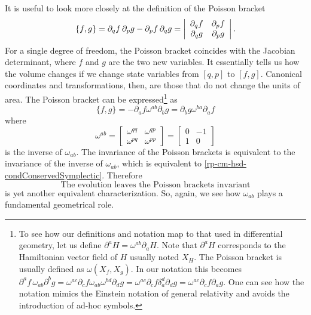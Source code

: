 It is useful to look more closely at the definition of the Poisson bracket
\begin{equation}
	\{f, g\} = \partial_q f \, \partial_p g - \partial_p f \, \partial_q g = \left|\begin{array}{ c c }
		\partial_q f & \partial_p f \\
		\partial_q g & \partial_p g \\
	\end{array} \right|.
\end{equation}
For a single degree of freedom, the Poisson bracket coincides with the Jacobian determinant, where $f$ and $g$ are the two new variables. It essentially tells us how the volume changes if we change state variables from $[q, p]$ to $[f, g]$. Canonical coordinates and transformations, then, are those that do not change the units of area. The Poisson bracket can be expressed\footnote{To see how our definitions and notation map to that used in differential geometry, let us define $\partial^a H = \omega^{ab} \partial_a H$. Note that $\partial^a H$ corresponds to the Hamiltonian vector field of $H$ usually noted $X_H$. The Poisson bracket is usually defined as $\omega(X_f, X_g)$. In our notation this becomes $\partial^a f \, \omega_{ab} \partial^b g = \omega^{ac} \partial_c f \omega_{ab} \omega^{bd} \partial_d g = \omega^{ac} \partial_c f \delta_a^d \partial_d g = \omega^{ac} \partial_c f \partial_a g$. One can see how the notation mimics the Einstein notation of general relativity and avoids the introduction of ad-hoc symbols.} as
\begin{equation}
	\{f, g\} = - \partial_a f \omega^{ab} \partial_b g = \partial_b g \omega^{ba} \partial_a f
\end{equation}
where 
\begin{equation}
	\omega^{ab} = \left[\begin{array}{cc}
		\omega^{qq} & \omega^{qp} \\
		\omega^{pq} & \omega^{pp} 
	\end{array} \right]= \left[\begin{array}{cc}
		0 & -1 \\
		1 & 0 
	\end{array} \right]
\end{equation}
is the inverse of $\omega_{ab}$. The invariance of the Poisson brackets is equivalent to the invariance of the inverse of $\omega_{ab}$, which is equivalent to \ref{rp-cm-hsd-condConservedSymplectic}. Therefore
\begin{equation}\label{rp-cm-hsd-condConservedPoisson}
	\tag{HM-7}
	\text{The evolution leaves the Poisson brackets invariant}
\end{equation}
is yet another equivalent characterization. So, again, we see how $\omega_{ab}$ plays a fundamental geometrical role.

